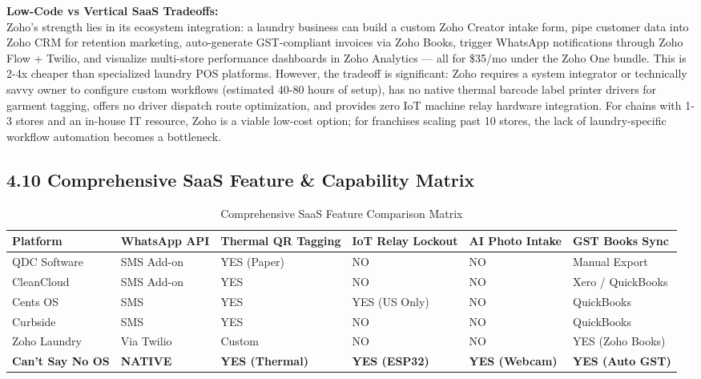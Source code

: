 \documentclass[11pt,a4paper]{article}
\begin{document}
\vspace{0.4cm}
\textbf{Low-Code vs Vertical SaaS Tradeoffs:}\\
Zoho's strength lies in its ecosystem integration: a laundry business can build a custom Zoho Creator intake form, pipe customer data into Zoho CRM for retention marketing, auto-generate GST-compliant invoices via Zoho Books, trigger WhatsApp notifications through Zoho Flow + Twilio, and visualize multi-store performance dashboards in Zoho Analytics --- all for \$35/mo under the Zoho One bundle. This is 2-4x cheaper than specialized laundry POS platforms. However, the tradeoff is significant: Zoho requires a system integrator or technically savvy owner to configure custom workflows (estimated 40-80 hours of setup), has no native thermal barcode label printer drivers for garment tagging, offers no driver dispatch route optimization, and provides zero IoT machine relay hardware integration. For chains with 1-3 stores and an in-house IT resource, Zoho is a viable low-cost option; for franchises scaling past 10 stores, the lack of laundry-specific workflow automation becomes a bottleneck.

\clearpage

\subsection{4.10 Comprehensive SaaS Feature \& Capability Matrix}

\begin{table}[h!]
\centering
\small
\begin{tabularx}{\textwidth}{XXXXXX}
\toprule
\textbf{Platform} & \textbf{WhatsApp API} & \textbf{Thermal QR Tagging} & \textbf{IoT Relay Lockout} & \textbf{AI Photo Intake} & \textbf{GST Books Sync} \\
\midrule
QDC Software & SMS Add-on & YES (Paper) & NO & NO & Manual Export \\
CleanCloud & SMS Add-on & YES & NO & NO & Xero / QuickBooks \\
Cents OS & SMS & YES & YES (US Only) & NO & QuickBooks \\
Curbside & SMS & YES & NO & NO & QuickBooks \\
Zoho Laundry & Via Twilio & Custom & NO & NO & YES (Zoho Books) \\
{\color{greenaccent}\textbf{Can't Say No OS}} & \textbf{NATIVE} & \textbf{YES (Thermal)} & \textbf{YES (ESP32)} & \textbf{YES (Webcam)} & \textbf{YES (Auto GST)} \\
\bottomrule
\end{tabularx}
\caption{Comprehensive SaaS Feature Comparison Matrix}
\end{table}
\end{document}
